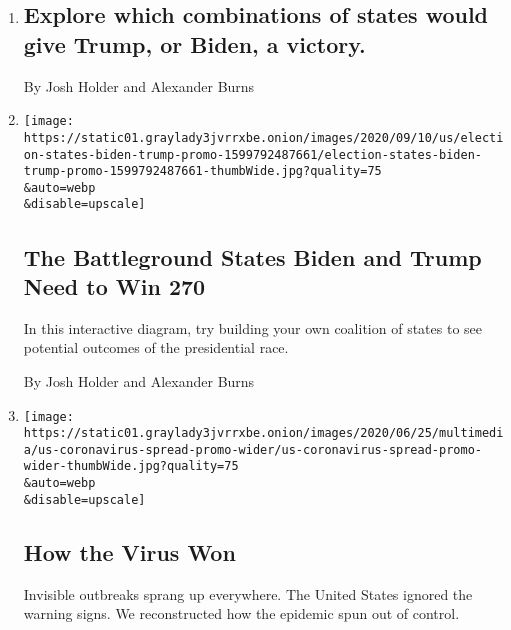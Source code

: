 \begin{enumerate}
\def\labelenumi{\arabic{enumi}.}
\item
  \href{/2020/09/01/us/elections/explore-which-combinations-of-states-would-give-trump-or-biden-a-victory.html}{}

  \hypertarget{explore-which-combinations-of-states-would-give-trump-or-biden-a-victory}{%
  \subsection{Explore which combinations of states would give Trump, or
  Biden, a
  victory.}\label{explore-which-combinations-of-states-would-give-trump-or-biden-a-victory}}

  By Josh Holder and Alexander Burns
\item
  \href{/interactive/2020/us/elections/election-states-biden-trump.html}{}

  \texttt{[image: https://static01.graylady3jvrrxbe.onion/images/2020/09/10/us/election-states-biden-trump-promo-1599792487661/election-states-biden-trump-promo-1599792487661-thumbWide.jpg?quality=75\\\&auto=webp\\\&disable=upscale]}

  \hypertarget{the-battleground-states-biden-and-trump-need-to-win-270}{%
  \subsection{The Battleground States Biden and Trump Need to Win
  270}\label{the-battleground-states-biden-and-trump-need-to-win-270}}

  In this interactive diagram, try building your own coalition of states
  to see potential outcomes of the presidential race.

  By Josh Holder and Alexander Burns
\item
  \href{/interactive/2020/us/coronavirus-spread.html}{}

  \texttt{[image: https://static01.graylady3jvrrxbe.onion/images/2020/06/25/multimedia/us-coronavirus-spread-promo-wider/us-coronavirus-spread-promo-wider-thumbWide.jpg?quality=75\\\&auto=webp\\\&disable=upscale]}

  \hypertarget{how-the-virus-won}{%
  \subsection{How the Virus Won}\label{how-the-virus-won}}

  Invisible outbreaks sprang up everywhere. The United States ignored
  the warning signs. We reconstructed how the epidemic spun out of
  control.


\end{enumerate}
